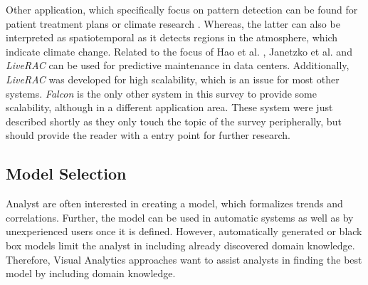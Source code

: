 \documentclass[electronic]{vgtc}             %
\begin{document}
Other application, which specifically focus on pattern detection can be found for patient treatment plans \cite{Gschwandtner:2011} or climate research \cite{Kehrer:2008}.
Whereas, the latter can also be interpreted as spatiotemporal as it detects regions in the atmosphere, which indicate climate change.
Related to the focus of Hao et al. \cite{Hao:2009, Hao:2011}, Janetzko et al. \cite{janetzko:2014} and \textit{LiveRAC} \cite{McLachlan:2008} can be used for predictive maintenance in data centers.
Additionally, \textit{LiveRAC} was developed for high scalability, which is an issue for most other systems.
\textit{Falcon}  \cite{steed:2017} is the only other system in this survey to provide some scalability, although in a different application area. 
These system were just described shortly as they only touch the topic of the survey peripherally, but should provide the reader with a entry point for further research.

\subsection{Model Selection\label{subsec:selection}}
Analyst are often interested in creating a model, which formalizes trends and correlations.
Further, the model can be used in automatic systems as well as by unexperienced users once it is defined. 
However, automatically generated or black box models limit the analyst in including already discovered domain knowledge. 
Therefore, Visual Analytics approaches want to assist analysts in finding the best model by including domain knowledge. 
\end{document}
